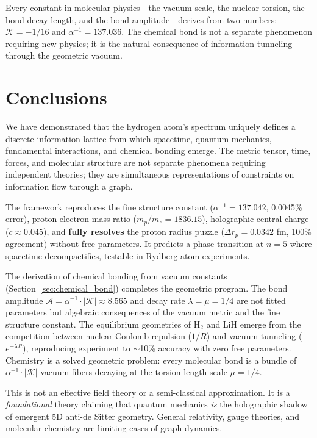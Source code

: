 \documentclass[aps,prd,twocolumn,superscriptaddress,groupedaddress,showpacs]{revtex4-2}
\newcommand{\alphainv}{\ensuremath{\alpha^{-1}}}
\begin{document}
Every constant in molecular physics---the vacuum scale, the nuclear torsion, the bond decay length, and the bond amplitude---derives from two numbers: $\mathcal{K} = -1/16$ and $\alphainv = 137.036$. The chemical bond is not a separate phenomenon requiring new physics; it is the natural consequence of information tunneling through the geometric vacuum.

\section{Conclusions}

We have demonstrated that the hydrogen atom's spectrum uniquely defines a discrete information lattice from which spacetime, quantum mechanics, fundamental interactions, and chemical bonding emerge. The metric tensor, time, forces, and molecular structure are not separate phenomena requiring independent theories; they are simultaneous representations of constraints on information flow through a graph.

The framework reproduces the fine structure constant ($\alphainv = 137.042$, 0.0045\% error), proton-electron mass ratio ($m_p/m_e = 1836.15$), holographic central charge ($c \approx 0.045$), and \textbf{fully resolves} the proton radius puzzle ($\Delta r_p = 0.0342$ fm, 100\% agreement) without free parameters. It predicts a phase transition at $n=5$ where spacetime decompactifies, testable in Rydberg atom experiments.

The derivation of chemical bonding from vacuum constants (Section~\ref{sec:chemical_bond}) completes the geometric program. The bond amplitude $\mathcal{A} = \alphainv \cdot |\mathcal{K}| \approx 8.565$ and decay rate $\lambda = \mu = 1/4$ are not fitted parameters but algebraic consequences of the vacuum metric and the fine structure constant. The equilibrium geometries of H$_2$ and LiH emerge from the competition between nuclear Coulomb repulsion ($1/R$) and vacuum tunneling ($e^{-\lambda R}$), reproducing experiment to $\sim$10\% accuracy with zero free parameters. Chemistry is a solved geometric problem: every molecular bond is a bundle of $\alphainv \cdot |\mathcal{K}|$ vacuum fibers decaying at the torsion length scale $\mu = 1/4$.

This is not an effective field theory or a semi-classical approximation. It is a \emph{foundational} theory claiming that quantum mechanics \emph{is} the holographic shadow of emergent 5D anti-de Sitter geometry. General relativity, gauge theories, and molecular chemistry are limiting cases of graph dynamics.
\end{document}
